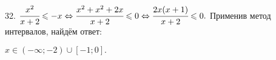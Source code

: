 32. $\cfrac{x^2}{x+2}\leqslant -x\Leftrightarrow\cfrac{x^2+x^2+2x}{x+2}\leqslant 0\Leftrightarrow\cfrac{2x(x+1)}{x+2}\leqslant 0.$
Применив метод интервалов, найдём ответ:
\begin{figure}[ht!]
\end{figure}
$x\in(-\infty;-2)\cup[-1;0].$\\
